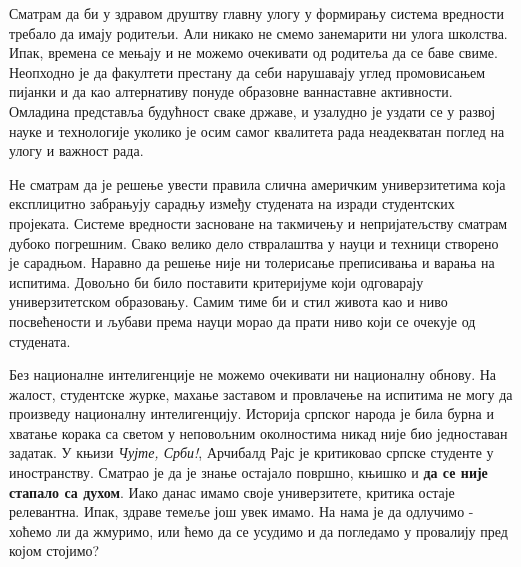 \documentclass[b5paper]{article}
\begin{document}
Сматрам да би у здравом друштву главну улогу у формирању система вредности требало да имају родитељи. Али никако не смемо занемарити ни улога школства. Ипак, времена се мењају и не можемо очекивати од родитеља да се баве свиме. Неопходно је да факултети престану да себи нарушавају углед промовисањем пијанки и да као алтернативу понуде образовне ваннаставне активности. Омладина представља будућност сваке државе, и узалудно је уздати се у развој науке и технологије уколико је осим самог квалитета рада неадекватан поглед на улогу и важност рада.

Не сматрам да је решење увести правила слична америчким универзитетима која експлицитно забрањују сарадњу између студената на изради студентских пројеката. Системе вредности засноване на такмичењу и непријатељству сматрам дубоко погрешним. Свако велико дело ствралаштва у науци и техници створено је сарадњом. Наравно да решење није ни толерисање преписивања и варања на испитима. Довољно би било поставити критеријуме који одговарају универзитетском образовању. Самим тиме би и стил живота као и ниво посвећености и љубави према науци морао да прати ниво који се очекује од студената.

Без националне интелигенције не можемо очекивати ни националну обнову. На жалост, студентске журке, махање заставом и провлачење на испитима не могу да произведу националну интелигенцију. Историја српског народа је била бурна и хватање корака са светом у неповољним околностима никад није био једноставан задатак. У књизи \textit{Чујте, Срби!}, Арчибалд Рајс је критиковао српске студенте у иностранству. Сматрао је да је знање остајало површно, књишко и \textbf{да се није стапало са духом}. Иако данас имамо своје универзитете, критика остаје релевантна. Ипак, здраве темеље још увек имамо. На нама је да одлучимо - хоћемо ли да жмуримо, или ћемо да се усудимо и да погледамо у провалију пред којом стојимо?
\end{document}
